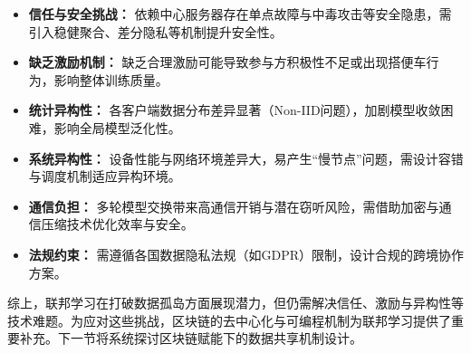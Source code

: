 \begin{itemize}
    \item \textbf{信任与安全挑战：} 依赖中心服务器存在单点故障与中毒攻击等安全隐患，需引入稳健聚合、差分隐私等机制提升安全性。
    \item \textbf{缺乏激励机制：} 缺乏合理激励可能导致参与方积极性不足或出现搭便车行为，影响整体训练质量。
    \item \textbf{统计异构性：} 各客户端数据分布差异显著（Non-IID问题），加剧模型收敛困难，影响全局模型泛化性。
    \item \textbf{系统异构性：} 设备性能与网络环境差异大，易产生“慢节点”问题，需设计容错与调度机制适应异构环境。
    \item \textbf{通信负担：} 多轮模型交换带来高通信开销与潜在窃听风险，需借助加密与通信压缩技术优化效率与安全。
    \item \textbf{法规约束：} 需遵循各国数据隐私法规（如GDPR）限制，设计合规的跨境协作方案\cite{li2019impact}。
\end{itemize}

综上，联邦学习在打破数据孤岛方面展现潜力，但仍需解决信任、激励与异构性等技术难题。为应对这些挑战，区块链的去中心化与可编程机制为联邦学习提供了重要补充。下一节将系统探讨区块链赋能下的数据共享机制设计。